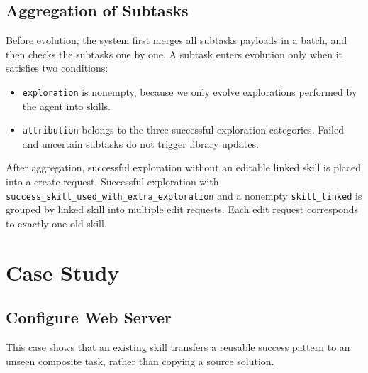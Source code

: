 \subsection{Aggregation of Subtasks}
Before evolution, the system first merges all subtasks payloads in a batch, and then checks the subtasks one by one. A subtask enters evolution only when it satisfies two conditions:
\begin{itemize}
    \item \texttt{exploration} is nonempty, because we only evolve explorations performed by the agent into skills.
    \item \texttt{attribution} belongs to the three successful exploration categories. Failed and uncertain subtasks do not trigger library updates.
\end{itemize}

After aggregation, successful exploration without an editable linked skill is placed into a create request. Successful exploration with \texttt{success\_skill\_used\_with\_extra\_exploration} and a nonempty \texttt{skill\_linked} is grouped by linked skill into multiple edit requests. Each edit request corresponds to exactly one old skill.

\FloatBarrier

\clearpage
\section{Case Study}
\label{app:case-study}

\subsection{Configure Web Server}
\label{app:case-apache-git}

\noindent This case shows that an existing skill transfers a reusable success pattern to an unseen composite task, rather than copying a source solution.\par\medskip

